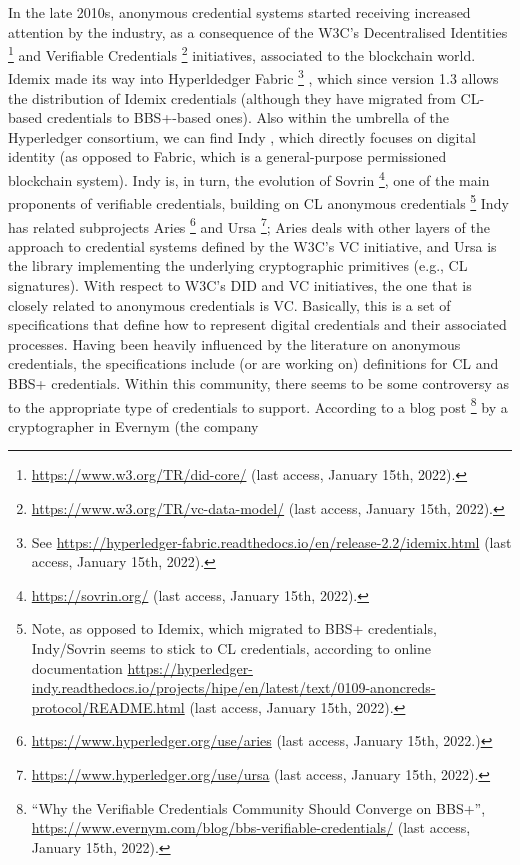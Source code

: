 In the late 2010s, anonymous credential systems started receiving increased
attention by the industry, as a consequence of the W3C's Decentralised
Identities%
\footnote{\url{https://www.w3.org/TR/did-core/} (last access, January 15th, 2022).}
and Verifiable Credentials%
\footnote{\url{https://www.w3.org/TR/vc-data-model/} (last access, January 15th,
  2022).} initiatives, associated to the blockchain world. Idemix made its way
into Hyperldedger Fabric%
\footnote{See \url{https://hyperledger-fabric.readthedocs.io/en/release-2.2/idemix.html} (last access, January 15th, 2022).}
, which since version 1.3 allows the distribution of Idemix credentials
(although they have migrated from CL-based credentials to BBS+-based ones).
Also within the umbrella of the Hyperledger consortium, we can find Indy
\needcite, which directly focuses on digital identity (as opposed to Fabric,
which is a general-purpose permissioned blockchain system). Indy is, in turn,
the evolution of Sovrin%
\footnote{\url{https://sovrin.org/} (last access, January 15th, 2022).}, one of
the main proponents of verifiable credentials, building on CL anonymous credentials%
\footnote{Note, as opposed to Idemix, which migrated to BBS+ credentials,
  Indy/Sovrin seems to stick to CL credentials, according to online
  documentation \url{https://hyperledger-indy.readthedocs.io/projects/hipe/en/latest/text/0109-anoncreds-protocol/README.html} (last access, January 15th, 2022).}
Indy has related subprojects Aries%
\footnote{\url{https://www.hyperledger.org/use/aries} (last access, January
  15th, 2022.)} and Ursa%
\footnote{\url{https://www.hyperledger.org/use/ursa} (last access, January 15th,
  2022).}; Aries deals
with other layers of the approach to credential systems defined by the W3C's
VC initiative, and Ursa is the library implementing the underlying cryptographic
primitives (e.g., CL signatures). With respect to W3C's DID and VC initiatives,
the one that is closely related to anonymous credentials is VC. Basically, this
is a set of specifications that define how to represent digital credentials and
their associated processes. Having been heavily influenced by the literature
on anonymous credentials, the specifications include (or are working on)
definitions for CL and BBS+ credentials. Within this community, there seems to
be some controversy as to the appropriate type of credentials to support.
According to a blog post%
\footnote{``Why the Verifiable Credentials Community Should Converge on BBS+'',
  \url{https://www.evernym.com/blog/bbs-verifiable-credentials/} (last
  access, January 15th, 2022).} by a cryptographer in Evernym (the company

